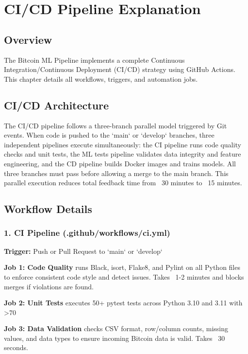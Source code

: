\chapter{CI/CD Pipeline Explanation}
\label{ch:cicd}

\section{Overview}

The Bitcoin ML Pipeline implements a complete Continuous Integration/Continuous Deployment (CI/CD) strategy using GitHub Actions. This chapter details all workflows, triggers, and automation jobs.

\section{CI/CD Architecture}

The CI/CD pipeline follows a three-branch parallel model triggered by Git events. When code is pushed to the `main` or `develop` branches, three independent pipelines execute simultaneously: the CI pipeline runs code quality checks and unit tests, the ML tests pipeline validates data integrity and feature engineering, and the CD pipeline builds Docker images and trains models. All three branches must pass before allowing a merge to the main branch. This parallel execution reduces total feedback time from ~30 minutes to ~15 minutes.

\section{Workflow Details}

\subsection{1. CI Pipeline (.github/workflows/ci.yml)}

\textbf{Trigger:} Push or Pull Request to `main` or `develop`

\textbf{Job 1: Code Quality} runs Black, isort, Flake8, and Pylint on all Python files to enforce consistent code style and detect issues. Takes ~1-2 minutes and blocks merges if violations are found.

\textbf{Job 2: Unit Tests} executes 50+ pytest tests across Python 3.10 and 3.11 with >70%

\textbf{Job 3: Data Validation} checks CSV format, row/column counts, missing values, and data types to ensure incoming Bitcoin data is valid. Takes ~30 seconds.

